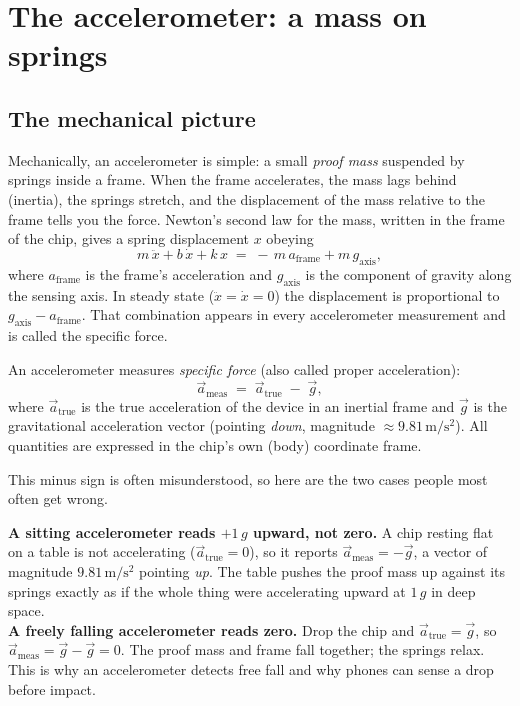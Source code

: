 \section{The accelerometer: a mass on springs}
\label{ch34:accel}

\subsection{The mechanical picture}

Mechanically, an accelerometer is simple: a small
\emph{proof mass} suspended by springs inside a frame. When the frame accelerates, the
mass lags behind (inertia), the springs stretch, and the displacement of the mass
relative to the frame tells you the force. Newton's second law for the mass, written
in the frame of the chip, gives a spring displacement $x$ obeying
\[
  m\,\ddot{x} + b\,\dot{x} + k\,x \;=\; -\,m\,a_{\text{frame}} + m\,g_{\text{axis}},
\]
where $a_{\text{frame}}$ is the frame's acceleration and $g_{\text{axis}}$ is the
component of gravity along the sensing axis. In steady state ($\ddot{x}=\dot{x}=0$) the
displacement is proportional to $g_{\text{axis}} - a_{\text{frame}}$. That combination
appears in every accelerometer measurement and is called the specific force.

\begin{definition}
\label{ch34:def-specific-force}
An accelerometer measures \emph{specific force} (also called proper acceleration):
\[
  \vec{a}_{\text{meas}} \;=\; \vec{a}_{\text{true}} \;-\; \vec{g},
\]
where $\vec{a}_{\text{true}}$ is the true acceleration of the device in an inertial
frame and $\vec{g}$ is the gravitational acceleration vector (pointing \emph{down},
magnitude $\approx 9.81\,\mathrm{m/s^2}$). All quantities are expressed in the chip's
own (body) coordinate frame.
\end{definition}

This minus sign is often misunderstood, so here are the two cases people most often
get wrong.

\begin{trapbox}
\textbf{A sitting accelerometer reads $+1\,g$ upward, not zero.}
A chip resting flat on a table is not accelerating ($\vec{a}_{\text{true}}=0$), so it
reports $\vec{a}_{\text{meas}} = -\vec{g}$, a vector of magnitude $9.81\,\mathrm{m/s^2}$
pointing \emph{up}. The table pushes the proof mass up against its springs exactly as
if the whole thing were accelerating upward at $1\,g$ in deep space. \\[4pt]
\textbf{A freely falling accelerometer reads zero.}
Drop the chip and $\vec{a}_{\text{true}} = \vec{g}$, so
$\vec{a}_{\text{meas}} = \vec{g}-\vec{g} = 0$. The proof mass and frame fall together;
the springs relax. This is why an accelerometer detects free fall and why phones can
sense a drop before impact.
\end{trapbox}


